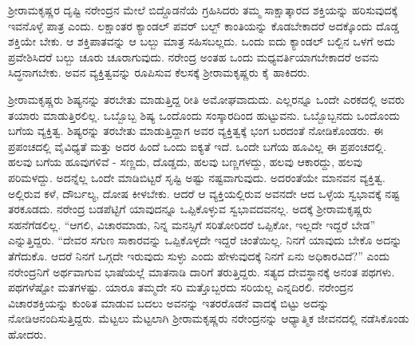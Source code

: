 \vskip 2pt

ಶ‍್ರೀರಾಮಕೃಷ್ಣರ ದೃಷ್ಟಿ ನರೇಂದ್ರನ ಮೇಲೆ ಬಿದ್ದೊಡನೆಯೆ ಗ್ರಹಿಸಿದರು ತಮ್ಮ ಸಾಕ್ಷಾತ್ಕಾರದ ಶಕ್ತಿಯನ್ನು ಹರಿಸುವುದಕ್ಕೆ ಇವನೊಳ್ಳೆ ಪಾತ್ರ ಎಂದು. ಲಕ್ಷಾಂತರ ಕ್ಯಾಂಡಲ್ ಪವರ್ ಬಲ್ಬ್ ಕಾಂತಿಯನ್ನು ಕೊಡಬೇಕಾದರೆ ಅದಕ್ಕೊಂದು ದೊಡ್ಡ ಶಕ್ತಿಯೇ ಬೇಕು. ಆ ಶಕ್ತಿಪಾತವನ್ನು ಆ ಬಲ್ಬು ಮಾತ್ರ ಸಹಿಸಬಲ್ಲದು. ಒಂದು ಐದು ಕ್ಯಾಂಡಲ್ ಬಲ್ಬಿನ ಒಳಗೆ ಅದು ಪ್ರವೇಶಿಸಿದರೆ ಬಲ್ಬು ಚೂರು ಚೂರಾಗುವುದು. ನರೇಂದ್ರ ಅಂತಹ ಒಂದು ಮಧ್ಯವರ್ತಿಯಾಗಬೇಕಾದರೆ ಅವನು ಸಿದ್ಧನಾಗಬೇಕು. ಅವನ ವ್ಯಕ್ತಿತ್ವವನ್ನು ರೂಪಿಸುವ ಕೆಲಸಕ್ಕೆ ಶ‍್ರೀರಾಮಕೃಷ್ಣರು ಕೈ ಹಾಕಿದರು.

\vskip 2pt

ಶ‍್ರೀರಾಮಕೃಷ್ಣರು ಶಿಷ್ಯನನ್ನು ತರಬೇತು ಮಾಡುತ್ತಿದ್ದ ರೀತಿ ಅಮೋಘವಾದುದು. ಎಲ್ಲರನ್ನೂ ಒಂದೇ ಎರಕದಲ್ಲಿ ಅವರು ತಯಾರು ಮಾಡುತ್ತಿರಲಿಲ್ಲ. ಒಬ್ಬೊಬ್ಬ ಶಿಷ್ಯ ಒಂದೊಂದು ಸಂಸ್ಕಾರದಿಂದ ಹುಟ್ಟುವನು. ಒಬ್ಬೊಬ್ಬನದು ಒಂದೊಂದು ಬಗೆಯ ವ್ಯಕ್ತಿತ್ವ. ಶಿಷ್ಯರನ್ನು ತರಬೇತು ಮಾಡುತ್ತಿದ್ದಾಗ ಅವರ ವ್ಯಕ್ತಿತ್ವಕ್ಕೆ ಭಂಗ ಬರದಂತೆ ನೋಡಿಕೊಂಡರು. ಈ ಪ್ರಪಂಚದಲ್ಲಿ ವೈವಿಧ್ಯತೆ ಮತ್ತು ಅದರ ಹಿಂದೆ ಒಂದು ಐಕ್ಯತೆ ಇದೆ. ಒಂದೇ ಬಗೆಯ ಹೂವಿಲ್ಲ ಈ ಪ್ರಪಂಚದಲ್ಲಿ. ಹಲವು ಬಗೆಯ ಹೂವುಗಳಿವೆ - ಸಣ್ಣದು, ದೊಡ್ಡದು, ಹಲವು ಬಣ್ಣಗಳದ್ದು, ಹಲವು ಆಕಾರದ್ದು, ಹಲವು ಪರಿಮಳದ್ದು. ಅದನ್ನೆಲ್ಲ ಒಂದೇ ಮಾಡಿಬಿಟ್ಟರೆ ಸೃಷ್ಟಿ ಅಷ್ಟು ನಷ್ಟವಾಗುವುದು. ಅದರಂತೆಯೇ ಮಾನವನ ವ್ಯಕ್ತಿತ್ವ. ಅಲ್ಲಿರುವ ಕಳೆ, ದೌರ್ಬಲ್ಯ, ದೋಷ ಕೀಳಬೇಕು. ಆದರೆ ಆ ವ್ಯಕ್ತಿಯಲ್ಲಿರುವ ಅವನದೇ ಆದ ಒಳ್ಳೆಯ ಸ್ವಭಾವಕ್ಕೆ ನಷ್ಟ ತರಕೂಡದು. ನರೇಂದ್ರ ಬಡಪೆಟ್ಟಿಗೆ ಯಾವುದನ್ನೂ ಒಪ್ಪಿಕೊಳ್ಳುವ ಸ್ವಭಾವದವನಲ್ಲ. ಅದಕ್ಕೆ ಶ‍್ರೀರಾಮಕೃಷ್ಣರು ಸಹನೆಗೆಡಲಿಲ್ಲ. “ಆಗಲಿ, ವಿಚಾರಮಾಡು, ನಿನ್ನ ಮನಸ್ಸಿಗೆ ಸರಿತೋರಿದರೆ ಒಪ್ಪಿಕೋ, ಇಲ್ಲದೇ ಇದ್ದರೆ ಬೇಡ” ಎನ್ನುತ್ತಿದ್ದರು. “ದೇವರ ಸಗುಣ ಸಾಕಾರವನ್ನು ಒಪ್ಪಿಕೊಳ್ಳದೇ ಇದ್ದರೆ ಚಿಂತೆಯಿಲ್ಲ. ನಿನಗೆ ಯಾವುದು ಬೇಕೊ ಅದನ್ನು ತೆಗೆದುಕೊ. ಆದರೆ ನಿನಗೆ ಒಗ್ಗದೇ ಇರುವುದು ಸುಳ್ಳು ಎಂದು ಹೇಳುವುದಕ್ಕೆ ನಿನಗೆ ಏನು ಅಧಿಕಾರವಿದೆ?” ಎಂದು ನರೇಂದ್ರನಿಗೆ ಅರ್ಥವಾಗುವ ಭಾಷೆಯಲ್ಲೆ ಮಾತನಾಡಿ ದಾರಿಗೆ ತರುತ್ತಿದ್ದರು. ಸತ್ಯದ ದೇವಸ್ಥಾನಕ್ಕೆ ಅನಂತ ಪಥಗಳು. ಪಥಗಳೆಷ್ಟೋ ಮತಗಳಷ್ಟು. ಯಾರೂ ತಮ್ಮದೇ ಸರಿ ಮತ್ತೊಬ್ಬರದು ಸರಿಯಲ್ಲ ಎನ್ನದಿರಲಿ. ನರೇಂದ್ರನ ವಿಚಾರಶಕ್ತಿಯನ್ನು ಕುಂಠಿತ ಮಾಡುವ ಬದಲು ಅವನನ್ನು ಇತರರೊಡನೆ ವಾದಕ್ಕೆ ಬಿಟ್ಟು ಅದನ್ನು ನೋಡಿ\break ಆನಂದಿಸುತ್ತಿದ್ದರು. ಮೆಟ್ಟಲು ಮೆಟ್ಟಲಾಗಿ ಶ‍್ರೀರಾಮಕೃಷ್ಣರು ನರೇಂದ್ರನನ್ನು ಆಧ್ಯಾತ್ಮಿಕ ಜೀವನದಲ್ಲಿ ನಡೆಸಿಕೊಂಡು ಹೋದರು.


